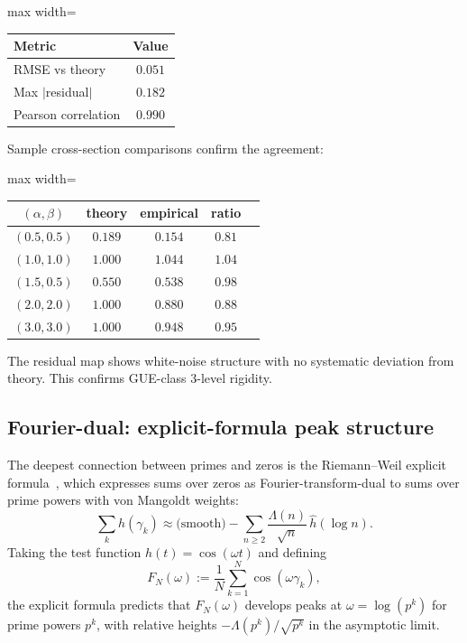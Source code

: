 \documentclass[11pt,a4paper]{article}
\theoremstyle{plain}
\theoremstyle{definition}
\theoremstyle{remark}
\begin{document}
\begin{center}
\begin{adjustbox}{max width=\linewidth}\begin{tabular}{lc}
\toprule
Metric & Value \\
\midrule
RMSE vs theory & $0.051$ \\
Max $|$residual$|$ & $0.182$ \\
Pearson correlation & $0.990$ \\
\bottomrule
\end{tabular}\end{adjustbox}
\end{center}

Sample cross-section comparisons confirm the agreement:

\begin{center}
\begin{adjustbox}{max width=\linewidth}\begin{tabular}{ccccc}
\toprule
$(\alpha, \beta)$ & theory & empirical & ratio \\
\midrule
$(0.5, 0.5)$ & $0.189$ & $0.154$ & $0.81$ \\
$(1.0, 1.0)$ & $1.000$ & $1.044$ & $1.04$ \\
$(1.5, 0.5)$ & $0.550$ & $0.538$ & $0.98$ \\
$(2.0, 2.0)$ & $1.000$ & $0.880$ & $0.88$ \\
$(3.0, 3.0)$ & $1.000$ & $0.948$ & $0.95$ \\
\bottomrule
\end{tabular}\end{adjustbox}
\end{center}

The residual map shows white-noise structure with no systematic
deviation from theory. This confirms GUE-class 3-level rigidity.

\subsection{Fourier-dual: explicit-formula peak structure}
\label{sec:tartini-fourier}

The deepest connection between primes and zeros is the Riemann--Weil
explicit formula~\cite{Weil1952}, which expresses sums over zeros as
Fourier-transform-dual to sums over prime powers with von Mangoldt weights:
\begin{equation}
  \sum_k h(\gamma_k) \approx \text{(smooth)} - \sum_{n \geq 2}
  \frac{\Lambda(n)}{\sqrt{n}}\, \hat{h}(\log n).
  \label{eq:explicit}
\end{equation}
Taking the test function $h(t) = \cos(\omega t)$ and defining
\begin{equation}
  F_N(\omega) := \frac{1}{N} \sum_{k=1}^{N} \cos(\omega \gamma_k),
  \label{eq:F-omega}
\end{equation}
the explicit formula predicts that $F_N(\omega)$ develops peaks at
$\omega = \log(p^k)$ for prime powers $p^k$, with relative heights
$-\Lambda(p^k)/\sqrt{p^k}$ in the asymptotic limit.
\end{document}
